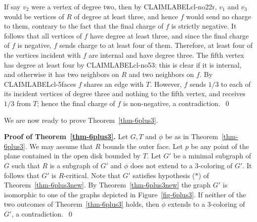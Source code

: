 \documentclass{article}
\def\refclaim#1{\csname CLAIMLABEL#1\endcsname}
\begin{document}
If say $v_2$ were a vertex of degree two, then by \refclaim{cl-no22r}, 
$v_1$ and $v_3$ would be  vertices of $R$
of degree at least three, and hence $f$ would send no charge to them,
contrary to the fact that the final charge of $f$ is strictly negative.
It follows that all vertices of $f$ have degree at least three, and since the 
final charge of $f$ is negative, $f$ sends charge to at least four of them.  
Therefore, at least four of the vertices incident with $f$
are internal and have degree three.  
The fifth vertex has degree at least four
by \refclaim{cl-no53}: this is clear if it is internal, and otherwise
it has two neighbors on $R$ and two neighbors on $f$.
By \refclaim{cl-5faces} $f$ shares an edge with $T$.  
However, $f$ sends $1/3$ to each of its incident vertices of degree three
and nothing to the fifth vertex,
and receives $1/3$ from $T$; hence the final charge of $f$ is non-negative,
a contradiction.~\qed
\bigskip

We are now ready to prove Theorem~\ref{thm-6plus3}.
\bigskip

\noindent
{\bf Proof of Theorem~\ref{thm-6plus3}.}
Let $G,T$ and $\phi$ be as in Theorem~\ref{thm-6plus3}.
We may assume that $R$ bounds the outer face.  Let $p$ be any point of the
plane contained in the open disk bounded by $T$.
Let $G'$ be a minimal subgraph of $G$ such that $R$ is a subgraph of $G'$
and $\phi$ does not extend to a $3$-coloring of $G'$.
It follows that $G'$ is $R$-critical.
Note that $G'$ satisfies hypothesis ($*$) of  Theorem~\ref{thm-6plus3new}.
By Theorem~\ref{thm-6plus3new} the graph $G'$ is isomorphic to one of
the graphs depicted in Figure~\ref{fig-6plus3}.
If neither of the two outcomes of Theorem~\ref{thm-6plus3} holds,
then $\phi$ extends to a $3$-coloring of $G'$, a contradiction.~\qed

\def\JCTB{{\it J.~Combin.\ Theory Ser.\ B}}
\def\JGT{{\it J.~Graph Theory}}
\end{document}
